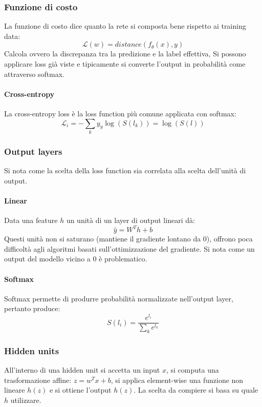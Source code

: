 		\subsubsection{Funzione di costo}
		La funzione di costo dice quanto la rete si composta bene rispetto ai training data:
		$$\mathcal{L}(w) = distance(f_\theta(x), y)$$
		Calcola ovvero la discrepanza tra la predizione e la label effettiva,
		Si possono applicare loss gi\`a viste e tipicamente si converte l'output in probabilit\`a come attraverso softmax.

			\paragraph{Cross-entropy}
			La cross-entropy loss \`e la loss function pi\`u comune applicata con softmax:
			$$\mathcal{L}_i = -\sum\limits_ky_y\log(S(l_k)) = \log(S(l))$$

		\subsubsection{Output layers}
		Si nota come la scelta della loss function sia correlata alla scelta dell'unit\`a di output.

			\paragraph{Linear}
			Data una feature $h$ un unit\`a di un layer di output lineari d\`a:
			$$\hat{y} = W^Th+b$$
			Questi unit\`a non si saturano (mantiene il gradiente lontano da $0$), offrono poca difficolt\`a agli algoritmi basati sull'ottimizzazione del gradiente.
			Si nota come un output del modello vicino a $0$ \`e problematico.

			\paragraph{Softmax}
			Softmax permette di produrre probabilit\`a normalizzate nell'output layer, pertanto produce:
			$$S(l_i) = \frac{e^{l_i}}{\sum\limits_ke^{l_k}}$$

		\subsubsection{Hidden units}
		All'interno di una hidden unit si accetta un input $x$, si computa una trasformazione affine: $z = w^Tx+b$, si applica element-wise una funzione non lineare $h(z)$ e si ottiene l'output $h(z)$.
		La scelta da compiere si basa su quale $h$ utilizzare.

